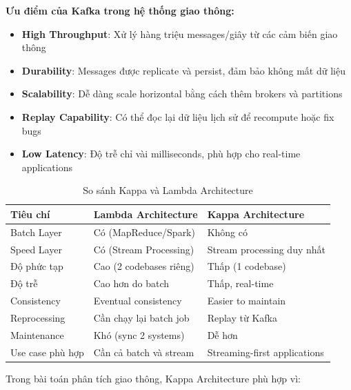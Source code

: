 \textbf{Ưu điểm của Kafka trong hệ thống giao thông:}

\begin{itemize}
    \item \textbf{High Throughput}: Xử lý hàng triệu messages/giây từ các cảm biến giao thông
    \item \textbf{Durability}: Messages được replicate và persist, đảm bảo không mất dữ liệu
    \item \textbf{Scalability}: Dễ dàng scale horizontal bằng cách thêm brokers và partitions
    \item \textbf{Replay Capability}: Có thể đọc lại dữ liệu lịch sử để recompute hoặc fix bugs
    \item \textbf{Low Latency}: Độ trễ chỉ vài milliseconds, phù hợp cho real-time applications
\end{itemize}


\begin{table}[h]
\centering
\caption{So sánh Kappa và Lambda Architecture}
\begin{tabular}{|p{3.5cm}|p{5cm}|p{5cm}|}
\hline
\textbf{Tiêu chí} & \textbf{Lambda Architecture} & \textbf{Kappa Architecture} \\ \hline
Batch Layer & Có (MapReduce/Spark) & Không có \\ \hline
Speed Layer & Có (Stream Processing) & Stream processing duy nhất \\ \hline
Độ phức tạp & Cao (2 codebases riêng) & Thấp (1 codebase) \\ \hline
Độ trễ & Cao hơn do batch & Thấp, real-time \\ \hline
Consistency & Eventual consistency & Easier to maintain \\ \hline
Reprocessing & Cần chạy lại batch job & Replay từ Kafka \\ \hline
Maintenance & Khó (sync 2 systems) & Dễ hơn \\ \hline
Use case phù hợp & Cần cả batch và stream & Streaming-first applications \\ \hline
\end{tabular}
\label{tab:kappa_lambda}
\end{table}


Trong bài toán phân tích giao thông, Kappa Architecture phù hợp vì:


